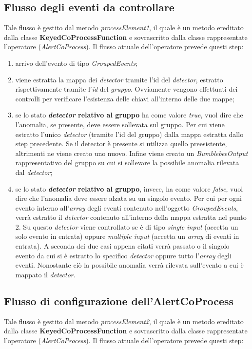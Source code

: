 \subsection{Flusso degli eventi da controllare}\label{sec:pr1-alertcoprocess}
Tale flusso è gestito dal metodo \textit{processElement1}, il quale è un metodo ereditato dalla classe \textbf{KeyedCoProcessFunction} e sovrascritto dalla classe rappresentate l'operatore (\textit{AlertCoProcess}). Il flusso attuale dell'operatore prevede questi step:
\begin{enumerate}
	\item{arrivo dell'evento di tipo \textit{GroupedEvents};}
	\item{viene estratta la mappa dei \textit{detector} tramite l'{id} del \textit{detector}, estratto rispettivamente tramite l'\textit{id} del \textit{gruppo}. Ovviamente vengono effettuati dei controlli per verificare l'esistenza delle chiavi all'interno delle due mappe;}
	\item{se lo stato \textbf{\textit{detector} relativo al gruppo} ha come valore \textit{true}, vuol dire che l'anomalia, se presente, deve essere sollevata sul gruppo. Per cui viene estratto l'unico \textit{detector} (tramite l'{id} del gruppo) dalla mappa estratta dallo step precedente. Se il detector è presente si utilizza quello preesistente, altrimenti ne viene creato uno nuovo. Infine viene creato un \textit{BumblebeeOutput} rappresentativo del gruppo su cui si sollevare la possibile anomalia rilevata dal \textit{detector};}
	\item{se lo stato \textbf{\textit{detector} relativo al gruppo}, invece, ha come valore \textit{false}, vuol dire che l'anomalia deve essere alzata su un singolo evento. Per cui per ogni evento interno all'\textit{array} degli eventi contenuto nell'oggetto \textit{GroupedEvents}, verrà estratto il \textit{detector} contenuto all'interno della mappa estratta nel punto 2. Su questo \textit{detector} viene controllato se è di tipo \textit{single input} (accetta un solo evento in entrata) oppure \textit{multiple input} (accetta un \textit{array} di eventi in entrata). A seconda dei due casi appena citati verrà passato o il singolo evento da cui si è estratto lo specifico \textit{detector} oppure tutto l'\textit{array} degli eventi. Nonostante ciò la possibile anomalia verrà rilevata sull'evento a cui è mappato il \textit{detector}.}
\end{enumerate}

\subsection{Flusso di configurazione dell'AlertCoProcess}\label{sec:pr2-alertcoprocess}
Tale flusso è gestito dal metodo \textit{processElement2}, il quale è un metodo ereditato dalla classe \textbf{KeyedCoProcessFunction} e sovrascritto dalla classe rappresentate l'operatore (\textit{AlertCoProcess}). Il flusso attuale dell'operatore prevede questi step:

